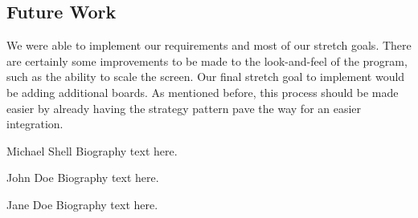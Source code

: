 \documentclass[10pt,conference,onecolumn,compsoc]{IEEEtran}
\begin{document}
\subsection{Future Work}
We were able to implement our requirements and most of our stretch goals. There are certainly some improvements to be made to the look-and-feel of the program, such as the ability to scale the screen. Our final stretch goal to implement would be adding additional boards. As mentioned before, this process should be made easier by already having the strategy pattern pave the way for an easier integration. 

\begin{IEEEbiography}{Michael Shell}
Biography text here.
\end{IEEEbiography}

\begin{IEEEbiographynophoto}{John Doe}
Biography text here.
\end{IEEEbiographynophoto}


\begin{IEEEbiographynophoto}{Jane Doe}
Biography text here.
\end{IEEEbiographynophoto}





\end{document}
